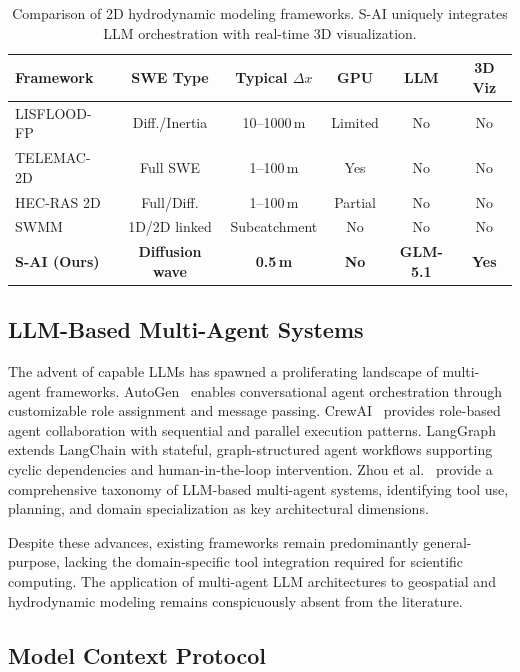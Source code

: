 \documentclass[11pt, a4paper]{article}
\begin{document}
\begin{table}[htbp]
\centering
\caption{Comparison of 2D hydrodynamic modeling frameworks. S-AI uniquely integrates LLM orchestration with real-time 3D visualization.}
\label{tab:hydro_comparison}
\small
\begin{tabular}{@{}lccccc@{}}
\toprule
\textbf{Framework} & \textbf{SWE Type} & \textbf{Typical $\Delta x$} & \textbf{GPU} & \textbf{LLM} & \textbf{3D Viz} \\
\midrule
LISFLOOD-FP~\cite{lisfloodfp} & Diff./Inertia & 10--1000\,m & Limited & No & No \\
TELEMAC-2D~\cite{telemac} & Full SWE & 1--100\,m & Yes & No & No \\
HEC-RAS 2D~\cite{hecras} & Full/Diff. & 1--100\,m & Partial & No & No \\
SWMM~\cite{swmm} & 1D/2D linked & Subcatchment & No & No & No \\
\textbf{S-AI (Ours)} & \textbf{Diffusion wave} & \textbf{0.5\,m} & \textbf{No} & \textbf{GLM-5.1} & \textbf{Yes} \\
\bottomrule
\end{tabular}
\end{table}

\subsection{LLM-Based Multi-Agent Systems}

The advent of capable LLMs has spawned a proliferating landscape of multi-agent frameworks. AutoGen~\cite{autogen} enables conversational agent orchestration through customizable role assignment and message passing. CrewAI~\cite{crewai} provides role-based agent collaboration with sequential and parallel execution patterns. LangGraph~\cite{langgraph} extends LangChain with stateful, graph-structured agent workflows supporting cyclic dependencies and human-in-the-loop intervention. Zhou et al.~\cite{zhou2024survey} provide a comprehensive taxonomy of LLM-based multi-agent systems, identifying tool use, planning, and domain specialization as key architectural dimensions.

Despite these advances, existing frameworks remain predominantly general-purpose, lacking the domain-specific tool integration required for scientific computing. The application of multi-agent LLM architectures to geospatial and hydrodynamic modeling remains conspicuously absent from the literature.

\subsection{Model Context Protocol}
\end{document}
